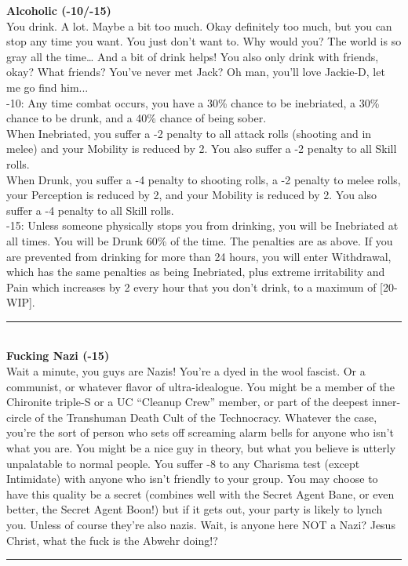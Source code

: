\documentclass[a4paper, twocolumn, openany]{book}
\begin{document}
{{\bfseries Alcoholic (-10/-15)\\}
You drink. A lot. Maybe a bit too much. Okay definitely too much, but you can stop any time you
want. You just don’t want to. Why would you? The world is so gray all the time… And a bit of
drink helps! You also only drink with friends, okay? What friends? You’ve never met Jack? Oh
man, you’ll love Jackie-D, let me go find him...\\
-10: Any time combat occurs, you have a 30\% chance to be inebriated, a 30\% chance to be
drunk, and a 40\% chance of being sober.\\
When Inebriated, you suffer a -2 penalty to all attack rolls (shooting and in melee) and your
Mobility is reduced by 2. You also suffer a -2 penalty to all Skill rolls.\\
When Drunk, you suffer a -4 penalty to shooting rolls, a -2 penalty to melee rolls, your
Perception is reduced by 2, and your Mobility is reduced by 2. You also suffer a -4 penalty to all
Skill rolls.\\
-15: Unless someone physically stops you from drinking, you will be Inebriated at all times. You
will be Drunk 60\% of the time. The penalties are as above. If you are prevented from drinking for
more than 24 hours, you will enter Withdrawal, which has the same penalties as being
Inebriated, plus extreme irritability and Pain which increases by 2 every hour that you don’t
drink, to a maximum of [20-WIP].\\
\hrule\ \\

{\bfseries Fucking Nazi (-15)\\}
Wait a minute, you guys are Nazis! You’re a dyed in the wool fascist. Or a communist, or
whatever flavor of ultra-idealogue. You might be a member of the Chironite triple-S or a UC
“Cleanup Crew” member, or part of the deepest inner-circle of the Transhuman Death Cult of
the Technocracy. Whatever the case, you’re the sort of person who sets off screaming alarm
bells for anyone who isn’t what you are. You might be a nice guy in theory, but what you believe
is utterly unpalatable to normal people. You suffer -8 to any Charisma test (except Intimidate)
with anyone who isn’t friendly to your group. You may choose to have this quality be a secret
(combines well with the Secret Agent Bane, or even better, the Secret Agent Boon!) but if it gets
out, your party is likely to lynch you. Unless of course they’re also nazis. Wait, is anyone here
NOT a Nazi? Jesus Christ, what the fuck is the Abwehr doing!?\\
\hrule\ \\

}
\end{document}
